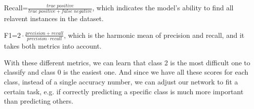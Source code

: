 \documentclass[12pt]{article}
\begin{document}
Recall=$\frac{true\;positive}{true\;positive+false\;negative}$, which indicates the model's ability to find all relavent instances in the dataset.

F1=$2\cdot\frac{precision+recall}{precision\cdot recall}$, which is the harmonic mean of precision and recall, and it takes both metrics into account.

With these different metrics, we can learn that class 2 is the most difficult one to classify and class 0 is the easiest one. And since we have all these scores for each class, instead of a single accuracy number, we can adjust our network to fit a certain task, e.g. if correctly predicting a specific class is much more important than predicting others.
\end{document}
